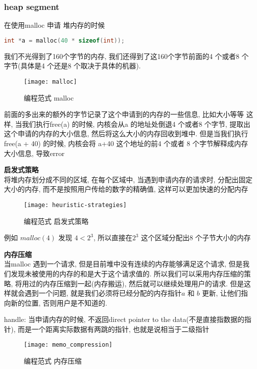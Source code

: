 \documentclass{article}
\begin{document}
\subsubsection{heap segment}
在使用malloc 申请 堆内存的时候
\begin{lstlisting}[language = C]
int *a = malloc(40 * sizeof(int));
\end{lstlisting}
我们不光得到了160个字节的内存,  我们还得到了这160个字节前面的4 个或者8 个字节(具体是4 个还是8 个取决于具体的机器).
\begin{figure}[htbp]
	\centering
	\texttt{[image: malloc]}\\
	\caption{编程范式 malloc}\label{fig.malloc}
\end{figure}

前面的多出来的额外的字节记录了这个申请到的内存的一些信息, 比如大小等等
这样, 当我们执行free(a) 的时候, 内核会从a 的地址处倒退4 个或者8 个字节, 提取出这个申请的内存的大小信息, 然后将这么大小的内存回收到堆中.
但是当我们执行free(a + 40) 的时候, 内核会将 a+40 这个地址的前4 个或者 8 个字节解释成内存大小信息, 导致error

\bigskip
\textbf{启发式策略}\\
将堆内存划分成不同的区域, 在每个区域中, 当遇到申请内存的请求时, 分配出固定大小的内存, 而不是按照用户传给的数字的精确值, 这样可以更加快速的分配内存
\begin{figure}[htbp]
	\centering
	\texttt{[image: heuristic-strategies]}\\
	\caption{编程范式 启发式策略}\label{fig.heuristic-strategies}
\end{figure}

例如 $malloc(4)$ 发现 $4 < 2^3$, 所以直接在$2^3$ 这个区域分配出$8$ 个子节大小的内存

\textbf{内存压缩}\\
当malloc 遇到一个请求, 但是目前堆中没有连续的内存能够满足这个请求, 但是我们发现未被使用的内存的和是大于这个请求值的.
所以我们可以采用内存压缩的策略, 将用过的内存压缩到一起(内存搬运), 然后就可以继续处理用户的请求.
但是这样就会遇到一个问题, 就是我们必须将已经分配的内存指针$a$ 和 $b$ 更新, 让他们指向新的位置, 否则用户是不知道的.

handle:
当申请内存的时候, 不返回direct pointer to the data(不是直接指数据的指针), 而是一个距离实际数据有两跳的指针, 也就是说相当于二级指针
\begin{figure}[htbp]
	\centering
	\texttt{[image: memo\_compression]}\\
	\caption{编程范式 内存压缩}\label{fig.memo.compression}
\end{figure}
\end{document}
